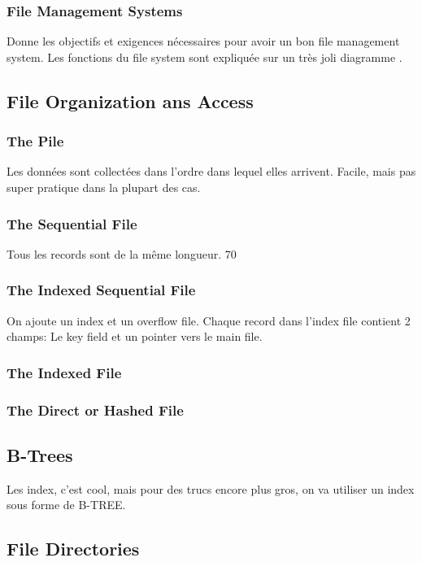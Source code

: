 \subsubsection{File Management Systems}
Donne les objectifs et exigences nécessaires pour avoir un bon file management system.
Les fonctions du file system sont expliquée sur un très joli diagramme \cite[p.~526]{stallings}.

\subsection{File Organization ans Access }
\subsubsection{The Pile}
Les données sont collectées dans l'ordre dans lequel elles arrivent.
Facile, mais pas super pratique dans la plupart des cas.

\subsubsection{The Sequential File}
Tous les records sont de la même longueur.
70

\subsubsection{The Indexed Sequential File}
On ajoute un index et un overflow file.
Chaque record dans l'index file contient 2 champs: Le key field et un pointer vers le main file.

\subsubsection{The Indexed File}

\subsubsection{The Direct or Hashed File}

\subsection{B-Trees}
Les index, c'est cool, mais pour des trucs encore plus gros, on va utiliser un index sous forme de B-TREE.

\subsection{File Directories}

